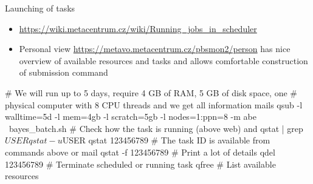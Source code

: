 \documentclass[compress, ucs, xelatex, 11pt, xcolor=svgnames,
  hyperref={
    bookmarks=true,
    unicode=true,
    colorlinks=true,
    pdftitle={Linux, command line and MetaCentrum},
    plainpages=false,
    pdfauthor={Vojtech Zeisek},
    pdfsubject={Course about use of Linux command line, writing shell scripts and using MetaCentrum of CESNET},
    pdfcreator={XeLaTeX},
    pdfkeywords={Linux, GNU, BASH, shell, command line, MetaCentrum},
    linkcolor=DarkRed,
    anchorcolor=DarkBlue,
    citecolor=Indigo,
    filecolor=NavyBlue,
    menucolor=DarkMagenta,
    urlcolor=DarkBlue,
    pdftex},
  url={hyphens, lowtilde} %
  ]{beamer}
\begin{document}
\begin{frame}[fragile]{Launching of tasks}
  \begin{itemize}
    \item \url{https://wiki.metacentrum.cz/wiki/Running_jobs_in_scheduler}
    \item Personal view \url{https://metavo.metacentrum.cz/pbsmon2/person} has nice overview of available resources and tasks and allows comfortable construction of submission command
  \end{itemize}
  \begin{bashcode}
    # We will run up to 5 days, require 4 GB of RAM, 5 GB of disk space, one
    # physical computer with 8 CPU threads and we get all information mails
    qsub -l walltime=5d -l mem=4gb -l scratch=5gb -l nodes=1:ppn=8 -m abe \
      bayes_batch.sh
    # Check how the task is running (above web) and
    qstat | grep $USER
    qstat -u $USER
    qstat 123456789 # The task ID is available from commands above or mail
    qstat -f 123456789 # Print a lot of details
    qdel 123456789 # Terminate scheduled or running task
    qfree # List available resources
  \end{bashcode}
\end{frame}
\end{document}
